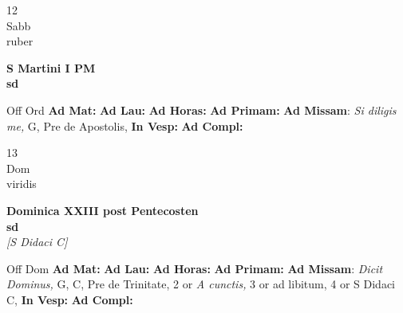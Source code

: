 \documentclass[10pt, openany]{book}
\begin{document}
        \begin{center}
            \begin{minipage}{3.5in}
                \vspace{2em}
                \begin{minipage}{0.5in}
                    {\Huge 12} \\
                    {\normalsize Sabb} \\
                    {\normalsize ruber}
                \end{minipage}
                \begin{minipage}{3.0in}
                    \textbf{ \large S Martini I PM \\
                    \textnormal{\normalsize sd}} \\ 
                \end{minipage}
                \begin{justify}Off Ord
                    \textbf{Ad Mat: }
                    \textbf{Ad Lau: }
                    \textbf{Ad Horas: }
                    \textbf{Ad Primam: }\textbf{Ad Missam}: \textit{Si diligis me,} G, Pre de Apostolis,  
                    \textbf{In Vesp: }
                    \textbf{Ad Compl: }
                \end{justify}
            \end{minipage}
        \end{center}
    
        \begin{center}
            \begin{minipage}{3.5in}
                \vspace{2em}
                \begin{minipage}{0.5in}
                    {\Huge 13} \\
                    {\normalsize Dom} \\
                    {\normalsize viridis}
                \end{minipage}
                \begin{minipage}{3.0in}
                    \textbf{ \large Dominica XXIII post Pentecosten \\
                    \textnormal{\normalsize sd}} \\ \textit{[S Didaci C]} \\ 
                \end{minipage}
                \begin{justify}Off Dom
                    \textbf{Ad Mat: }
                    \textbf{Ad Lau: }
                    \textbf{Ad Horas: }
                    \textbf{Ad Primam: }\textbf{Ad Missam}: \textit{Dicit Dominus,} G, C, Pre de Trinitate, 2 or \textit{A cunctis,} 3 or ad libitum, 4 or S Didaci C,  
                    \textbf{In Vesp: }
                    \textbf{Ad Compl: }
                \end{justify}
            \end{minipage}
        \end{center}
    
\end{document}

